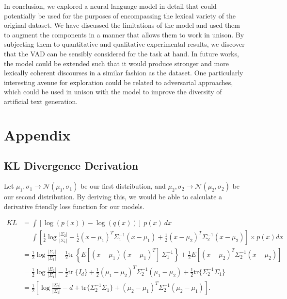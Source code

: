 \documentclass[12pt,twoside]{report}
\begin{document}
In conclusion, we explored a neural language model in detail that could potentially be used for the purposes of encompassing the lexical variety of the original dataset. We have discussed the limitations of the model and used them to augment the components in a manner that allows them to work in unison. By subjecting them to quantitative and qualitative experimental results, we discover that the VAD can be sensibly considered for the task at hand. In future works, the model could be extended such that it would produce stronger and more lexically coherent discourses in a similar fashion as the dataset. One particularly interesting avenue for exploration could be related to adversarial approaches, which could be used in unison with the model to improve the diversity of artificial text generation.


\begin{small}
 
\end{small}
\chapter{Appendix}

\section{KL Divergence Derivation}
\label{kl_derivation}
Let $\mu_1, \sigma_1 \rightarrow \mathcal{N}(\mu_1,\sigma_1)$ be our first distribution, and $\mu_2, \sigma_2 \rightarrow \mathcal{N}(\mu_2,\sigma_2)$ be our second distribution. By deriving this, we would be able to calculate a derivative friendly loss function for our models.

\begin{equation}
	\label{eq:t}
	\begin{aligned}
	KL &= \int \left[\log( p(x)) - \log( q(x)) \right]\ p(x)\ dx \\
	&= \int \left[ \frac{1}{2} \log\frac{|\Sigma_2|}{|\Sigma_1|} - \frac{1}{2} (x-\mu_1)^T\Sigma_1^{-1}(x-\mu_1) + \frac{1}{2} (x-\mu_2)^T\Sigma_2^{-1}(x-\mu_2) \right] \times p(x) dx \\
	&= \frac{1}{2} \log\frac{|\Sigma_2|}{|\Sigma_1|} - \frac{1}{2} \text{tr}\ \left\{E[(x - \mu_1)(x - \mu_1)^T] \ \Sigma_1^{-1} \right\} + \frac{1}{2} E[(x - \mu_2)^T \Sigma_2^{-1} (x - \mu_2)] \\
	&= \frac{1}{2} \log\frac{|\Sigma_2|}{|\Sigma_1|} - \frac{1}{2} \text{tr}\ \{I_d \} + \frac{1}{2} (\mu_1 - \mu_2)^T \Sigma_2^{-1} (\mu_1 - \mu_2) + \frac{1}{2} \text{tr} \{ \Sigma_2^{-1} \Sigma_1 \} \\
	&= \frac{1}{2}\left[\log\frac{|\Sigma_2|}{|\Sigma_1|} - d + \text{tr} \{ \Sigma_2^{-1}\Sigma_1 \} + (\mu_2 - \mu_1)^T \Sigma_2^{-1}(\mu_2 - \mu_1)\right].
\end{aligned}
\end{equation}
\end{document}
